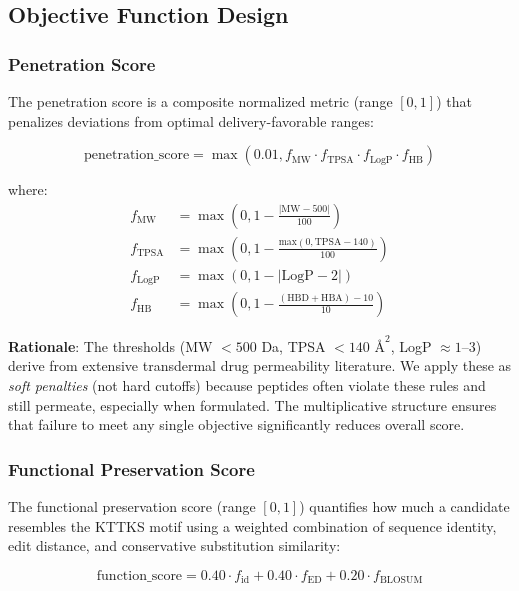 \documentclass[11pt,a4paper]{article}
\begin{document}
\subsection{Objective Function Design}

\subsubsection{Penetration Score}

The penetration score is a composite normalized metric (range $[0, 1]$) that penalizes deviations from optimal delivery-favorable ranges:

\begin{equation}
\text{penetration\_score} = \max(0.01, f_{\text{MW}} \cdot f_{\text{TPSA}} \cdot f_{\text{LogP}} \cdot f_{\text{HB}})
\end{equation}

where:
\begin{align}
f_{\text{MW}} &= \max(0, 1 - \frac{\text{|MW} - 500\text{|}}{100}) \\
f_{\text{TPSA}} &= \max(0, 1 - \frac{\text{max}(0, \text{TPSA} - 140)}{100}) \\
f_{\text{LogP}} &= \max(0, 1 - |\text{LogP} - 2|) \\
f_{\text{HB}} &= \max(0, 1 - \frac{(\text{HBD} + \text{HBA}) - 10}{10})
\end{align}

\textbf{Rationale}: The thresholds (MW $< 500$ Da, TPSA $< 140$ $\text{\AA}^2$, LogP $\approx 1$--$3$) derive from extensive transdermal drug permeability literature\cite{potts1992, mitragotri2004}. We apply these as \textit{soft penalties} (not hard cutoffs) because peptides often violate these rules and still permeate, especially when formulated. The multiplicative structure ensures that failure to meet any single objective significantly reduces overall score.

\subsubsection{Functional Preservation Score}

The functional preservation score (range $[0, 1]$) quantifies how much a candidate resembles the KTTKS motif using a weighted combination of sequence identity, edit distance, and conservative substitution similarity:

\begin{equation}
\text{function\_score} = 0.40 \cdot f_{\text{id}} + 0.40 \cdot f_{\text{ED}} + 0.20 \cdot f_{\text{BLOSUM}}
\end{equation}
\end{document}
